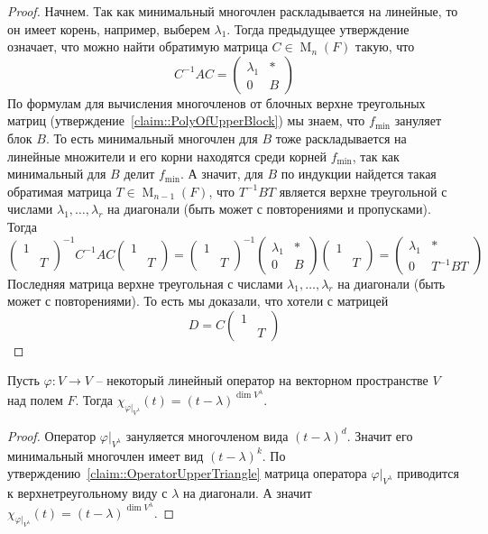 \begin{proof}
Начнем. Так как минимальный многочлен раскладывается на линейные, то он имеет корень, например, выберем $\lambda_1$. Тогда предыдущее утверждение означает, что можно найти обратимую матрица $C\in \operatorname{M}_n(F)$ такую, что
\[
C^{-1}AC =
\begin{pmatrix}
{\lambda_1}&{*}\\
{0}&{B}
\end{pmatrix}
\]
По формулам для вычисления многочленов от блочных верхне треугольных матриц (утверждение~\ref{claim::PolyOfUpperBlock}) мы знаем, что $f_\text{min}$ зануляет блок $B$. То есть минимальный многочлен для $B$ тоже раскладывается на линейные множители и его корни находятся среди корней $f_\text{min}$, так как минимальный для $B$ делит $f_\text{min}$. А значит, для $B$ по индукции найдется такая обратимая матрица $T\in \operatorname{M}_{n-1}(F)$, что $T^{-1}BT$ является верхне треугольной с числами $\lambda_1,\ldots,\lambda_r$ на диагонали (быть может с повторениями и пропусками). Тогда
\[
\begin{pmatrix}
{1}&{}\\
{}&{T}
\end{pmatrix}^{-1}
C^{-1}AC
\begin{pmatrix}
{1}&{}\\
{}&{T}
\end{pmatrix}
=
\begin{pmatrix}
{1}&{}\\
{}&{T}
\end{pmatrix}^{-1}
\begin{pmatrix}
{\lambda_1}&{*}\\
{0}&{B}
\end{pmatrix}
\begin{pmatrix}
{1}&{}\\
{}&{T}
\end{pmatrix}=
\begin{pmatrix}
{\lambda_1}&{*}\\
{0}&{T^{-1}BT}
\end{pmatrix}
\]
Последняя матрица верхне треугольная с числами $\lambda_1,\ldots,\lambda_r$ на диагонали (быть может с повторениями). То есть мы доказали, что хотели с матрицей
\[
D = C 
\begin{pmatrix}
{1}&{}\\
{}&{T}
\end{pmatrix}
\]
\end{proof}

\begin{claim}\label{claim::CharPolyOnRootSpace}
Пусть $\varphi\colon V\to V$ -- некоторый линейный оператор на векторном пространстве $V$ над полем $F$. Тогда $\chi_{\varphi|_{V^\lambda}} (t) = (t - \lambda)^{\dim V^\lambda}$.
\end{claim}
\begin{proof}
Оператор $\varphi|_{V^\lambda}$ зануляется многочленом вида $(t-\lambda)^d$. Значит его минимальный многочлен имеет вид $(t-\lambda)^k$. По утверждению~\ref{claim::OperatorUpperTriangle} матрица оператора $\varphi|_{V^\lambda}$ приводится к верхнетреугольному виду с $\lambda$ на диагонали. А значит $\chi_{\varphi|_{V^\lambda}}(t) = (t - \lambda)^{\dim V^{\lambda}}$.
\end{proof}

